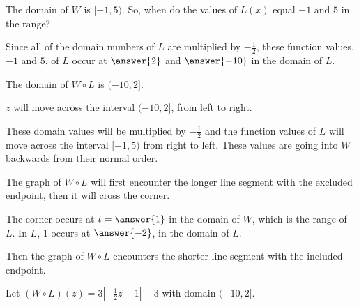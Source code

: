 \documentclass{ximera}
\begin{document}
The domain of $W$ is $[-1, 5)$.  So, when do the values of $L(x)$ equal $-1$ and $5$ in the range?  



\begin{question}

Since all of the domain numbers of $L$ are multiplied by $-\frac{1}{2}$, these function values, $-1$ and $5$, of $L$ occur at $\answer{2}$ and $\answer{-10}$ in the domain of $L$. 

\end{question}


The domain of $W \circ L$ is $(-10, 2]$. 



$z$ will move across the interval $(-10, 2]$, from left to right.  

These domain values will be multiplied by $-\frac{1}{2}$ and the function values of $L$ will move across the interval $[-1, 5)$ from right to left.  These values are going into $W$ backwards from their normal order.

The graph of $W \circ L$ will first encounter the longer line segment with the excluded endpoint, then it will cross the corner.  

\begin{question}

The corner occurs at $ t = \answer{1}$ in the domain of $W$, which is the range of $L$. In $L$, $1$ occurs at $\answer{-2}$, in the domain of $L$.  

\end{question}

Then the graph of $W \circ L$ encounters the shorter line segment with the included endpoint. 





Let $(W \circ L)(z) = 3 |-\frac{1}{2}z-1| - 3$ with domain $(-10, 2]$.
\end{document}
